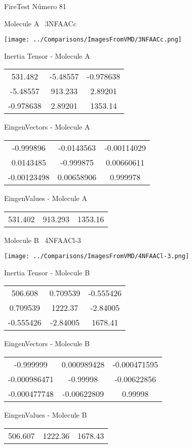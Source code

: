 \vtab[-3cm]
\begin{center}
{\large FireTest \tab Número 81}
\end{center}
\begin{multicols}{2}
\begin{center}

Molecule A \
3NFAACc

\texttt{[image: ../Comparisons/ImagesFromVMD/3NFAACc.png]}

Inertia Tensor - Molecule A \\
\begin{tabular}{|c c c|}
531.482	 & 	-5.48557	 & 	-0.978638	 \\
-5.48557	 & 	913.233	 & 	2.89201	 \\
-0.978638	 & 	2.89201	 & 	1353.14
\end{tabular}

\vtab
 EingenVectors - Molecule A     \\
\begin{tabular}{|c c c|}
-0.999896	 & 	-0.0143563	 & 	-0.00114029	 \\
0.0143485	 & 	-0.999875	 & 	0.00660611	 \\
-0.00123498	 & 	0.00658906	 & 	0.999978
\end{tabular}

\vtab
 EingenValues - Molecule A     \\
\begin{tabular}{|c c c|}
531.402	 & 	913.293	 & 	1353.16	 \\
\end{tabular}
\columnbreak

Molecule B \
4NFAACl-3

\texttt{[image: ../Comparisons/ImagesFromVMD/4NFAACl-3.png]}

Inertia Tensor - Molecule B \\
\begin{tabular}{|c c c|}
506.608	 & 	0.709539	 & 	-0.555426	 \\
0.709539	 & 	1222.37	 & 	-2.84005	 \\
-0.555426	 & 	-2.84005	 & 	1678.41
\end{tabular}

\vtab
 EingenVectors - Molecule B     \\
\begin{tabular}{|c c c|}
-0.999999	 & 	0.000989428	 & 	-0.000471595	 \\
-0.000986471	 & 	-0.99998	 & 	-0.00622856	 \\
-0.000477748	 & 	-0.00622809	 & 	0.99998
\end{tabular}

\vtab
 EingenValues - Molecule B     \\
\begin{tabular}{|c c c|}
506.607	 & 	1222.36	 & 	1678.43	 \\
\end{tabular}

\end{center}
\end{multicols}

